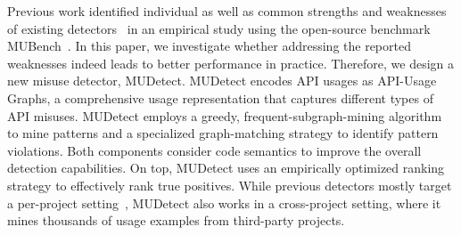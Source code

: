 %
%

Previous work identified individual as well as common strengths and weaknesses of existing detectors~\cite{ANNN+17} in an empirical study using the open-source benchmark MUBench~\cite{mubench}.
In this paper, we investigate whether addressing the reported weaknesses indeed leads to better performance in practice. 
Therefore, we design a new misuse detector, MUDetect. 
MUDetect encodes API usages as API-Usage Graphs, a comprehensive usage representation that captures different types of API misuses.
MUDetect employs a greedy, frequent-subgraph-mining algorithm to mine patterns and a specialized graph-matching strategy to identify pattern violations. %
Both components consider code semantics to improve the overall detection capabilities.
On top, MUDetect uses an empirically optimized ranking strategy to effectively rank true positives.
While previous detectors mostly target a per-project setting~\cite{ANNN+17}, MUDetect also works in a cross-project setting, where it mines thousands of usage examples from third-party projects.

